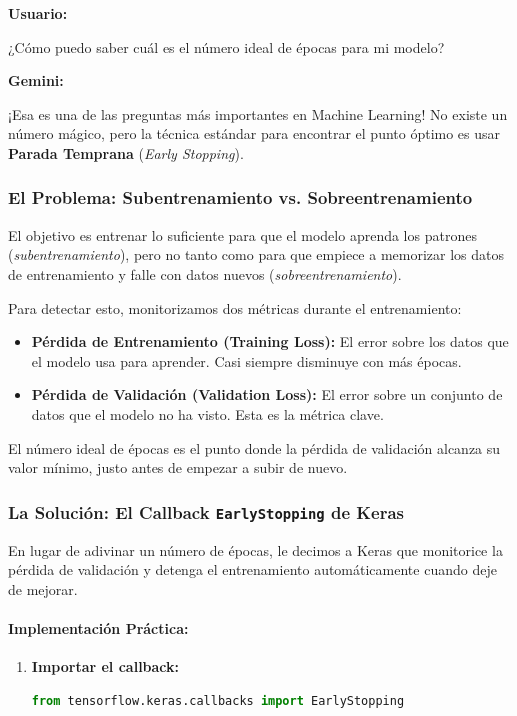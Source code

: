 \documentclass[12pt, a4paper]{article}
\newenvironment{usuario}{\par\noindent\textbf{Usuario:}\itshape\par\ignorespaces}{\par}
\newenvironment{gemini}{\par\noindent\textbf{Gemini:}\par\ignorespaces}{\par}
\begin{document}
\begin{usuario}
¿Cómo puedo saber cuál es el número ideal de épocas para mi modelo?
\end{usuario}

\begin{gemini}
¡Esa es una de las preguntas más importantes en Machine Learning! No existe un número mágico, pero la técnica estándar para encontrar el punto óptimo es usar \textbf{Parada Temprana} (\textit{Early Stopping}).

\subsubsection{El Problema: Subentrenamiento vs. Sobreentrenamiento}
El objetivo es entrenar lo suficiente para que el modelo aprenda los patrones (\textit{subentrenamiento}), pero no tanto como para que empiece a memorizar los datos de entrenamiento y falle con datos nuevos (\textit{sobreentrenamiento}).

Para detectar esto, monitorizamos dos métricas durante el entrenamiento:
\begin{itemize}
    \item \textbf{Pérdida de Entrenamiento (Training Loss):} El error sobre los datos que el modelo usa para aprender. Casi siempre disminuye con más épocas.
    \item \textbf{Pérdida de Validación (Validation Loss):} El error sobre un conjunto de datos que el modelo no ha visto. Esta es la métrica clave.
\end{itemize}

El número ideal de épocas es el punto donde la pérdida de validación alcanza su valor mínimo, justo antes de empezar a subir de nuevo.

\subsubsection{La Solución: El Callback \texttt{EarlyStopping} de Keras}
En lugar de adivinar un número de épocas, le decimos a Keras que monitorice la pérdida de validación y detenga el entrenamiento automáticamente cuando deje de mejorar.

\paragraph{Implementación Práctica:}
\begin{enumerate}
    \item \textbf{Importar el callback:}
    \begin{lstlisting}[language=Python]
from tensorflow.keras.callbacks import EarlyStopping
    \end{lstlisting}
    

\end{enumerate}
\end{gemini}
\end{document}
